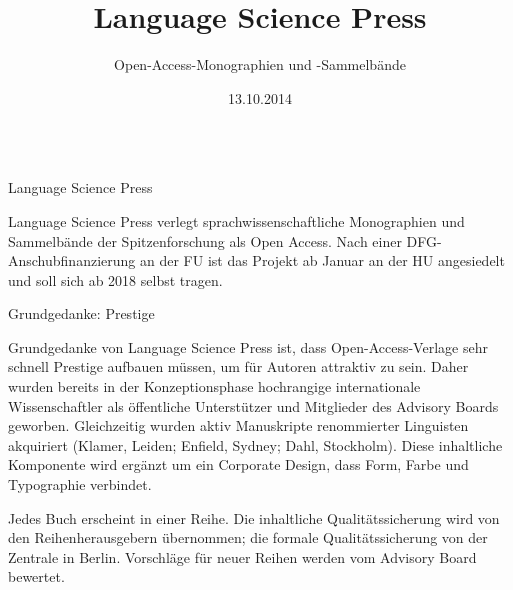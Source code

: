 \documentclass[final,utf8]{beamer}
\title{\Huge Language Science Press}
\author{Open-Access-Monographien und -Sammelb\"ande}
\institute{Sebastian Nordhoff} %
\date{13.10.2014}
\begin{document}
\begin{frame}{} 
\vspace{-1cm}
\begin{columns}[t]
  \begin{column}{.45\linewidth}  
    \begin{block}{Language Science Press} 
	\parbox{.9\textwidth}{
	Language Science Press verlegt sprachwissenschaftliche Monographien und Sammelb\"ande der Spitzenforschung als Open Access.
	Nach einer DFG-Anschubfinanzierung an der FU ist das Projekt ab Januar an der HU angesiedelt und soll sich ab 2018 selbst tragen.  
}
    \end{block}    
	
 
    \begin{block}{Grundgedanke: Prestige} 
	\parbox{.9\textwidth}{
	Grundgedanke von Language Science Press ist, dass Open-Access-Verlage sehr schnell Prestige aufbauen m\"ussen, um f\"ur Autoren attraktiv zu sein. Daher wurden bereits in der Konzeptionsphase hochrangige internationale Wissenschaftler als \"offentliche Unterst\"utzer und Mitglieder des Advisory Boards geworben. Gleichzeitig wurden aktiv Manuskripte renommierter Linguisten akquiriert (Klamer, Leiden; Enfield, Sydney; Dahl, Stockholm). Diese inhaltliche Komponente wird ergänzt um ein Corporate Design, dass Form, Farbe und Typographie verbindet. 

	Jedes Buch erscheint in einer Reihe. Die inhaltliche Qualit\"atssicherung wird von den Reihenherausgebern \"ubernommen; die formale Qualit\"atssicherung von der Zentrale in Berlin. Vorschl\"age f\"ur neuer Reihen werden vom Advisory Board bewertet.
}
    \end{block}    


\end{column}
\end{columns}
\end{frame}
\end{document}
